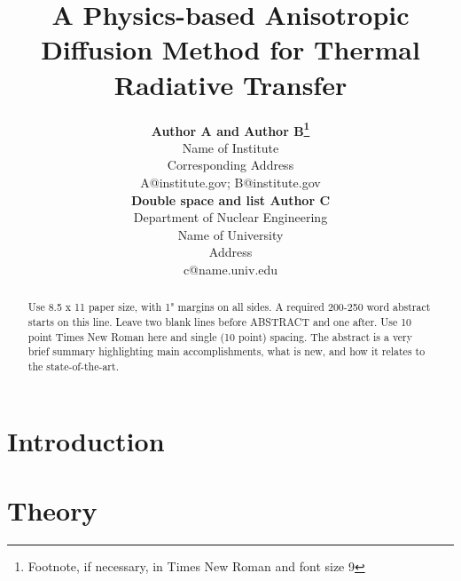 \documentclass[11pt,letter,twoside]{mc2011}
\begin{document}
\title{A Physics-based Anisotropic Diffusion Method for Thermal Radiative
Transfer}

\author{
\textbf{Author A and Author B\footnote{Footnote, if necessary, in Times New Roman and font size 9}}\\
Name of Institute\\
Corresponding Address\\
A@institute.gov; B@institute.gov \vspace{1.0em} \\ 
\textbf{Double space and list Author C}\\
Department of Nuclear Engineering\\
Name of University\\
Address\\
c@name.univ.edu
}

\maketitle

\thispagestyle{empty}

\begin{abstract}
Use 8.5 x 11 paper size, with 1" margins on all sides. A required 200-250 word abstract starts on this line.  
Leave two blank lines before ABSTRACT and one after.  Use 10 point Times New Roman here and single 
(10 point) spacing.  The abstract is a very brief summary highlighting main accomplishments, what is new, 
and how it relates to the state-of-the-art.


\end{abstract}

\newcommand\authorname{Seth~R.~Johnson and Edward~W.~Larsen}
\newcommand\shorttitlename{A physics-based anisotropic diffusion method for TRT}


\section{Introduction}

\section{Theory}
\end{document}
